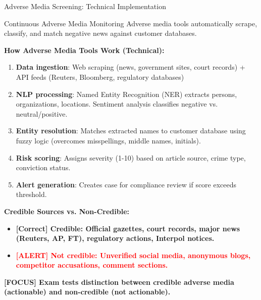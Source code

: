 \documentclass[11pt,a4paper]{beamer}
\newcommand{\redflag}[1]{\textcolor{red}{\textbf{[ALERT] #1}}}
\newcommand{\greennote}[1]{\textcolor{green!50!black}{\textbf{[Correct] #1}}}
\newcommand{\examfocus}[1]{\textcolor{orange!80!black}{\textbf{[FOCUS] #1}}}
\begin{document}
\begin{frame}{Adverse Media Screening: Technical Implementation}
	\begin{block}{Continuous Adverse Media Monitoring}
		Adverse media tools automatically scrape, classify, and match negative news against customer databases.
	\end{block}
	\textbf{How Adverse Media Tools Work (Technical):}
	\begin{enumerate}
		\item \textbf{Data ingestion}: Web scraping (news, government sites, court records) + API feeds (Reuters, Bloomberg, regulatory databases)
		\item \textbf{NLP processing}: Named Entity Recognition (NER) extracts persons, organizations, locations. Sentiment analysis classifies negative vs. neutral/positive.
		\item \textbf{Entity resolution}: Matches extracted names to customer database using fuzzy logic (overcomes misspellings, middle names, initials).
		\item \textbf{Risk scoring}: Assigns severity (1-10) based on article source, crime type, conviction status.
		\item \textbf{Alert generation}: Creates case for compliance review if score exceeds threshold.
	\end{enumerate}
	\textbf{Credible Sources vs. Non-Credible:}
\begin{itemize}
	\item \greennote{Credible: Official gazettes, court records, major news (Reuters, AP, FT), regulatory actions, Interpol notices.}
	\item \redflag{Not credible: Unverified social media, anonymous blogs, competitor accusations, comment sections.}
\end{itemize}
	\examfocus{Exam tests distinction between credible adverse media (actionable) and non-credible (not actionable).}
\end{frame}
\end{document}
